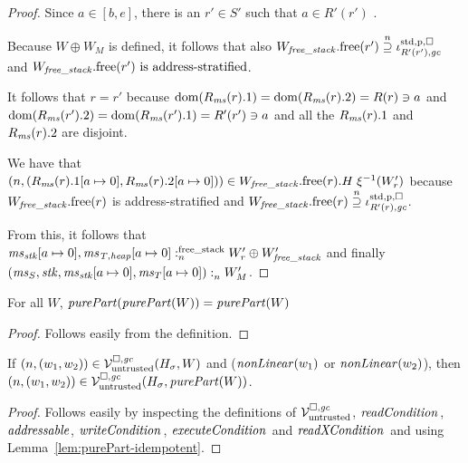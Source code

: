 \documentclass[a4paper]{article}
\begin{document}
\begin{proof}
  Since $a \in [b,e]$, there is an $r' \in S'$ such that $a \in R'(r')$ .
  
  Because $W \oplus W_M$ is defined, it follows that also 
  $\pwfree[W_\var{free\_stack}](r') \nsupeq \stdreg{R'(r'),\gc}{\pur}$ and
  $\pwfree[W_\var{free\_stack}](r') \text{ is address-stratified}$.

  It follows that $r = r'$ because $\dom(R_\ms(r).1) = \dom(R_\ms(r).2) = R(r) \ni a$ and $ \dom(R_\ms(r').2) = \dom(R_\ms(r').1) = R'(r') \ni a$ and all the $R_\ms(r).1$ and $R_\ms(r).2$ are disjoint.

  We have that $\npair{(R_\ms(r).1\update{a}{0},R_\ms(r).2\update{a}{0})} \in \pwfree[W_\var{free\_stack}](r).H \; \xi^{-1}(W_r')$ because $\pwfree[W_\var{free\_stack}](r)$ is address-stratified and $\pwfree[W_\var{free\_stack}](r) \nsupeq \stdreg{R'(r),\gc}{\pur}$.

  From this, it follows that $\memSatFStack{\ms_\stk\update{a}{0},\ms_\var{T,heap}\update{a}{0}}{W_r' \oplus W_\var{free\_stack}'}$ and finally $\memSat{(\ms_S,\stk,\ms_\stk\update{a}{0},\ms_T\update{a}{0})}{W_M'}$.
\end{proof}

\begin{lemma}
  For all $W$, $\mathit{purePart}( \purePart{W} ) = \purePart{W}$
  \label{lem:purePart-idempotent}
\end{lemma}
\begin{proof}
  Follows easily from the definition.
\end{proof}

\begin{lemma}
  \label{lem:non-linear-pure}
  If $\npair{(w_1,w_2)} \in \lrv(H_\sigma,W)$ and ($\nonLinear{w_1}$ or $\nonLinear{w_2}$), then
  $\npair{(w_1,w_2)} \in \lrv(H_\sigma,\purePart{W})$.
\end{lemma}
\begin{proof}
  Follows easily by inspecting the definitions of $\lrv$, $\readCond[]{}$, $\addressable{}$, $\writeCond[]{}$, $\execCond[]{}$ and $\xReadCond[]{}$ and using Lemma~\ref{lem:purePart-idempotent}.
\end{proof}
\end{document}
